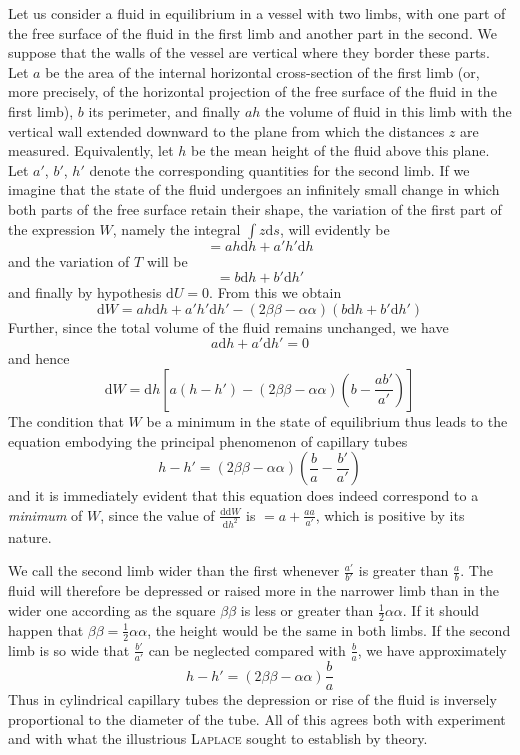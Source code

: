 Let us consider a fluid in equilibrium in a vessel with two limbs, with one part of the free surface of the fluid in the first limb and another part in the second. We suppose that the walls of the vessel are vertical where they border these parts. Let $a$ be the area of the internal horizontal cross-section of the first limb (or, more precisely, of the horizontal projection of the free surface of the fluid in the first limb), $b$ its perimeter, and finally $ah$ the volume of fluid in this limb with the vertical wall extended downward to the plane from which the distances $z$ are measured. Equivalently, let $h$ be the mean height of the fluid above this plane. Let $a'$, $b'$, $h'$ denote the corresponding quantities for the second limb. If we imagine that the state of the fluid undergoes an infinitely small change in which both parts of the free surface retain their shape, the variation of the first part of the expression $W$, namely the integral $\int z\mathrm{d}s$, will evidently be
\[
=ah\mathrm{d}h+a'h'\mathrm{d}h
\]
and the variation of $T$ will be
\[
=b\mathrm{d}h+b'\mathrm{d}h'
\]
and finally by hypothesis $\mathrm{d}U=0$. From this we obtain
\[
\mathrm{d}W=ah\mathrm{d}h+a'h'\mathrm{d}h'-(2\beta\beta-\alpha\alpha)(b\mathrm{d}h+b'\mathrm{d}h')
\]
Further, since the total volume of the fluid remains unchanged, we have
\[
a\mathrm{d}h+a'\mathrm{d}h'=0
\]
and hence
\[
\mathrm{d}W=\mathrm{d}h[a(h-h')-(2\beta\beta-\alpha\alpha)(b-\frac{ab'}{a'})]
\]
The condition that $W$ be a minimum in the state of equilibrium thus leads to the equation embodying the principal phenomenon of capillary tubes
\[
h-h'=(2\beta\beta-\alpha\alpha)(\frac{b}{a}-\frac{b'}{a'})
\]
and it is immediately evident that this equation does indeed correspond to a \textit{minimum} of $W$, since the value of $\frac{\mathrm{d}\mathrm{d}W}{\mathrm{d}h^2}$ is $=a+\frac{aa}{a'}$, which is positive by its nature.

We call the second limb wider than the first whenever $\frac{a'}{b'}$ is greater than $\frac{a}{b}$. The fluid will therefore be depressed or raised more in the narrower limb than in the wider one according as the square $\beta\beta$ is less or greater than $\frac12\alpha\alpha$. If it should happen that $\beta\beta=\frac12\alpha\alpha$, the height would be the same in both limbs. If the second limb is so wide that $\frac{b'}{a'}$ can be neglected compared with $\frac{b}{a}$, we have approximately
\[
h-h'=(2\beta\beta-\alpha\alpha)\frac{b}{a}
\]
Thus in cylindrical capillary tubes the depression or rise of the fluid is inversely proportional to the diameter of the tube. All of this agrees both with experiment and with what the illustrious \textsc{Laplace} sought to establish by theory.

